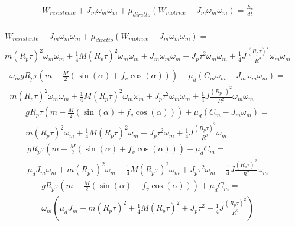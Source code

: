\documentclass[main.tex]{subfiles}
\begin{document}
\begin{align*}
  W_{resistente} + J_m  \omega_{m}\dot{\omega}_{m} + \mu_{diretto}(W_{motrice} -  J_m  \omega_{m}\dot{\omega}_{m})  = \frac{E_c}{dt} \\
\end{align*}

\begin{equation}
\begin{split}
W_{resistente} + J_m  \omega_{m}\dot{\omega}_{m} + \mu_{diretto}(W_{motrice} -  J_m  \omega_{m}\dot{\omega}_{m})  = \\ m(R_p\tau)^2\omega_{m}\dot{\omega}_{m} + \frac{1}{4}M(R_p\tau)^2\omega_{m}\dot{\omega}_{m} + J_m  \omega_{m}\dot{\omega}_{m} + J_p \tau^2\omega_{m}\dot{\omega}_{m} + \frac{1}{4}J \frac{(R_p\tau)^2}{R^2}\omega_{m}\dot{\omega}_{m}\\
\end{split}
\end{equation}
\begin{equation}
\begin{split}
\omega_{m}gR_p\tau(m -\frac{M}{2}(\sin(\alpha) + f_v\cos(\alpha))) + \mu_{d}(C_m\omega_m -  J_m  \omega_{m}\dot{\omega}_{m})  = \\ m(R_p\tau)^2\omega_{m}\dot{\omega}_{m} + \frac{1}{4}M(R_p\tau)^2\omega_{m}\dot{\omega}_{m} + J_p \tau^2\omega_{m}\dot{\omega}_{m} + \frac{1}{4}J \frac{(R_p\tau)^2}{R^2}\omega_{m}\dot{\omega}_{m}
\end{split}
\end{equation}
\begin{equation}
\begin{split}
gR_p\tau(m -\frac{M}{2}(\sin(\alpha) + f_v\cos(\alpha))) + \mu_{d}(C_m -  J_m \dot{\omega}_{m})  = \\ m(R_p\tau)^2\dot{\omega}_{m} + \frac{1}{4}M(R_p\tau)^2\dot{\omega}_{m} + J_p \tau^2\dot{\omega}_{m} + \frac{1}{4}J \frac{(R_p\tau)^2}{R^2}\dot{\omega}_{m}
\end{split}
\end{equation}
\begin{equation}
\begin{split}
gR_p\tau(m -\frac{M}{2}(\sin(\alpha) + f_v\cos(\alpha))) + \mu_{d}C_m = \\ \mu_{d}J_m \dot{\omega}_{m} + m(R_p\tau)^2\dot{\omega}_{m} + \frac{1}{4}M(R_p\tau)^2\dot{\omega}_{m} + J_p \tau^2\dot{\omega}_{m} + \frac{1}{4}J \frac{(R_p\tau)^2}{R^2}\dot{\omega}_{m}
\end{split}
\end{equation}
\begin{equation}
\begin{split}
gR_p\tau(m -\frac{M}{2}(\sin(\alpha) + f_v\cos(\alpha))) + \mu_{d}C_m = \\ \dot{\omega_m}(\mu_{d}J_m  + m(R_p\tau)^2 + \frac{1}{4}M(R_p\tau)^2 + J_p \tau^2 + \frac{1}{4}J \frac{(R_p\tau)^2}{R^2})
\end{split}
\end{equation}
\end{document}
